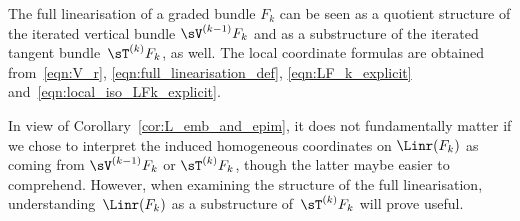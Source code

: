 \begin{Corollary}\label{cor:L_emb_and_epim} The full linearisation of a graded bundle $F_k$ can be seen as a quotient structure of the iterated vertical bundle $\sV^{(k-1)} F_k$ and as a substructure of the iterated tangent bundle~$\sT^{(k)} F_k$, as well. The local coordinate formulas are obtained from~\eqref{eqn:V_r}, \eqref{eqn:full_linearisation_def}, \eqref{eqn:LF_k_explicit} and~\eqref{eqn:local_iso_LFk_explicit}.
\end{Corollary}

In view of Corollary~\ref{cor:L_emb_and_epim}, it does not fundamentally matter if we chose to interpret the induced homogeneous coordinates on $\Linr(F_{k})$ as coming from $\sV^{(k-1)}F_{k}$ or $\sT^{(k)}F_{k}$, though the latter maybe easier to comprehend. However, when examining the structure of the full linearisation, understanding~$\Linr(F_{k})$ as a substructure of~$\sT^{(k)}F_{k}$ will prove useful.

